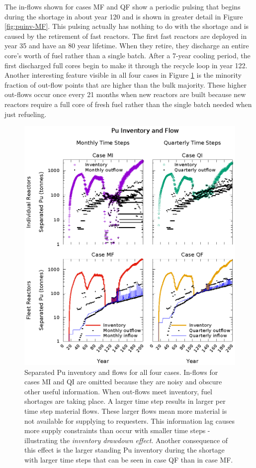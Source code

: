 \documentclass{style}
\begin{document}
The in-flows shown for cases MF and QF show a periodic pulsing that begins
during the shortage in about year 120 and is shown in greater detail in Figure \ref{fig:puinv-MF}. This pulsing actually has nothing to
do with the shortage and is caused by the retirement of fast reactors.  The
first fast reactors are deployed in year 35 and have an 80 year lifetime.
When they retire, they discharge an entire core's worth of fuel rather than a
single batch.  After a 7-year cooling period, the first discharged full cores
begin to make it through the recycle loop in year 122.  Another interesting
feature visible in all four cases in Figure \ref{fig:puinv} is the minority
fraction of out-flow points that are higher than the bulk majority. These
higher out-flows occur once every 21 months when new reactors are built because
new reactors require a full core of fresh fuel rather than the single batch
needed when just refueling.  

\begin{figure}[!h]
    \centering
    \includegraphics[width=1.0\textwidth]{exp2/puinv.eps}
    \caption[Separated Pu inventory and flow]{
        Separated Pu inventory and flows for all four cases.  In-flows for
        cases MI and QI are omitted because they are noisy and obscure other
        useful information.  When out-flows meet inventory, fuel shortages are taking place. A larger time step results in larger per time
        step material flows. These larger flows mean more material is not
        available for supplying to requesters.  This information lag causes
        more supply constraints than occur with smaller time steps -
        illustrating the \emph{inventory drawdown effect}. Another consequence of
        this effect is the larger standing Pu inventory during the shortage
        with larger time steps that can be seen in case QF than in case MF.
    }
    \label{fig:puinv}
\end{figure}
\end{document}
